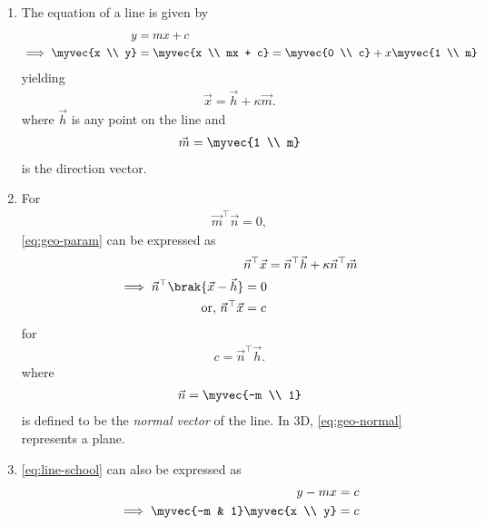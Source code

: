 \begin{enumerate}[label=\thesubsection.\arabic*.,ref=\thesubsection.\theenumi]
\item The equation of a line is given by 
\begin{align}
			\label{eq:line-school}
	y &= mx + c
	\\
	\implies \myvec{x \\ y} &= \myvec{x \\ 
	 mx + c} =\myvec{0 \\ c} + x\myvec{1 \\ m}
\end{align}
			yielding 
\begin{align}
\label{eq:geo-param}
	\vec{x} = \vec{h} + \kappa \vec{m}.
\end{align}
where $\vec{h}$ is any point on the line and 
\begin{align}
			\label{eq:line-school-dir}
\vec{m} = \myvec{1 \\ m}
\end{align}
is the direction vector. 
\item 
	For
\begin{align}
	\vec{m}^{\top}\vec{n} = 0,
\end{align}
\eqref{eq:geo-param}
	can be expressed as
\begin{align}
	\vec{n}^{\top}\vec{x} &= \vec{n}^{\top}\vec{h} + \kappa \vec{n}^{\top}\vec{m}
	\\
	\begin{split}
	\implies	\vec{n}^{\top}\brak{\vec{x}-\vec{h}} &=0 
	\\
		\text{or, }
	\vec{n}^{\top}\vec{x} &= c
	\end{split}
	\label{eq:geo-normal}
\end{align}
for 
\begin{align}
c = 	\vec{n}^{\top}\vec{h}. 
\end{align}
where
\begin{align}
\vec{n}=\myvec{-m \\ 1}
			\label{eq:line-school-normal}
\end{align}
is defined to be the
{\em normal vector}
		of the line.  
	In 3D, \eqref{eq:geo-normal} represents a plane.
	\iffalse
\item 			\eqref{eq:line-school} can also be expressed as
\begin{align}
	y - mx &= c 
	\\
	\implies \myvec{-m & 1}\myvec{x \\ y} &= c
\end{align}

\end{enumerate}
